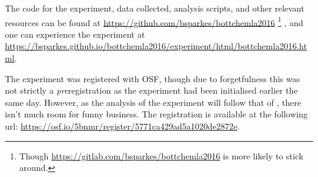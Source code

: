 \documentclass[10pt]{article}
\begin{document}
\begin{multicols}{2}
The code for the experiment, data collected, analysis scripts, and other relevant resources can be found at \url{https://github.com/bsparkes/bottchemla2016}\nolinebreak
\footnote{Though \url{https://gitlab.com/bsparkes/bottchemla2016} is more likely to stick around.}\nolinebreak
, and one can experience the experiment at \url{https://bsparkes.github.io/bottchemla2016/experiment/html/bottchemla2016.html}.






The experiment was registered with OSF, though due to forgetfulness this was not strictly a \emph{pre}registration as the experiment had been initialised earlier the same day.
However, as the analysis of the experiment will follow that of \citeauthor{Bott:2016aa}, there isn't much room for funny business.
The registration is available at the following url: \url{https://osf.io/5bnmr/register/5771ca429ad5a1020de2872e}.




\end{multicols}
\end{document}
